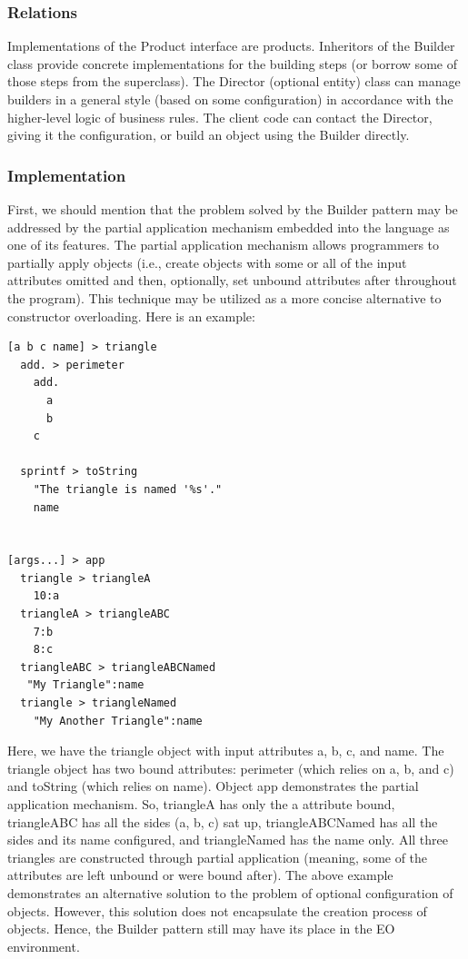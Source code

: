 \documentclass[sigplan,12pt,nonacm=true,review=false]{acmart}
\begin{document}
\subsubsection{Relations}
Implementations of the Product interface are products. Inheritors of the Builder class provide concrete implementations for the building steps (or borrow some of those steps from the superclass). The Director (optional entity) class can manage builders in a general style (based on some configuration) in accordance with the higher-level logic of business rules. The client code can contact the Director, giving it the configuration, or build an object using the Builder directly.

\subsubsection{Implementation}
First, we should mention that the problem solved by the Builder pattern may be addressed by the partial application mechanism embedded into the language as one of its features. The partial application mechanism allows programmers to partially apply objects (i.e., create objects with some or all of the input attributes omitted and then, optionally, set unbound attributes after throughout the program). This technique may be utilized as a more concise alternative to constructor overloading. Here is an example:
\begin{verbatim}
[a b c name] > triangle
  add. > perimeter
    add.
      a
      b
    c

  sprintf > toString
    "The triangle is named '%s'."
    name


[args...] > app
  triangle > triangleA
    10:a
  triangleA > triangleABC
    7:b
    8:c
  triangleABC > triangleABCNamed
   "My Triangle":name
  triangle > triangleNamed
    "My Another Triangle":name

\end{verbatim}


Here, we have the triangle object with input attributes a, b, c, and name. The triangle object has two bound attributes: perimeter (which relies on a, b, and c) and toString (which relies on name). Object app demonstrates the partial application mechanism. So, triangleA has only the a attribute bound, triangleABC has all the sides (a, b, c) sat up, triangleABCNamed has all the sides and its name configured, and triangleNamed has the name only. All three triangles are constructed through partial application (meaning, some of the attributes are left unbound or were bound after). The above example demonstrates an alternative solution to the problem of optional configuration of objects. However, this solution does not encapsulate the creation process of objects. Hence, the Builder pattern still may have its place in the EO environment.
\end{document}
